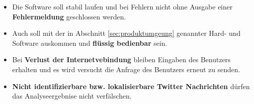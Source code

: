 \begin{itemize}[noitemsep,topsep=0.5em]
	\item Die Software soll stabil laufen und bei Fehlern nicht ohne Ausgabe einer \textbf{Fehlermeldung} geschlossen werden.
	\item Auch soll mit der in Abschnitt \ref{sec:produktumgeung} genannter Hard- und Software auskommen und \textbf{flüssig bedienbar} sein.
	\item Bei \textbf{Verlust der Internetvebindung} bleiben Eingaben des Benutzers erhalten und es wird versucht die Anfrage des Benutzers erneut zu senden.
	\item \textbf{Nicht identifizierbare bzw. lokalisierbare Twitter Nachrichten} dürfen das Analyseergebnise nicht verfälschen.
\end{itemize}
